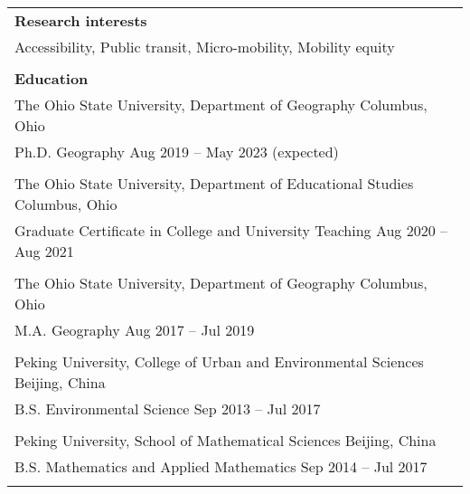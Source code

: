 \documentclass[letterpaper, 11pt]{article}
\begin{document}
\begin{longtable}{p{6.5in}}

\nohyphens{\textbf{Research interests}} \\
Accessibility, Public transit, Micro-mobility, Mobility equity \\
\\


\textbf{Education} 
\\ The Ohio State University, Department of Geography \hfill Columbus, Ohio \\
Ph.D. Geography \hfill Aug 2019 -- May 2023 (expected) \\

\\ The Ohio State University, Department of Educational Studies \hfill Columbus, Ohio \\
Graduate Certificate in College and University Teaching \hfill Aug 2020 -- Aug 2021 \\

\\ The Ohio State University, Department of Geography \hfill Columbus, Ohio \\
M.A. Geography \hfill Aug 2017 -- Jul 2019 \\

\\ Peking University, College of Urban and Environmental Sciences \hfill Beijing, China \\
B.S. Environmental Science \hfill Sep 2013 -- Jul 2017 \\

\\ Peking University, School of Mathematical Sciences \hfill Beijing, China \\
B.S. Mathematics and Applied Mathematics \hfill Sep 2014 -- Jul 2017 \\ \\



\end{longtable}
\end{document}
